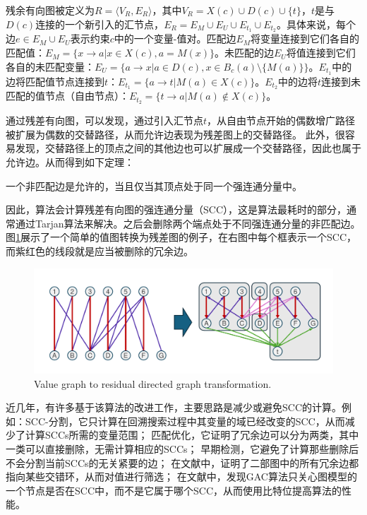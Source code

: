 \begin{definition}
    残余有向图被定义为$R = \langle V_R, E_R \rangle$，其中$V_R = X(c) \cup D(c) \cup \{t\}$，$t$是与$D(c)$连接的一个新引入的汇节点，$E_R = E_M \cup E_U \cup E_{t_1} \cup E_{t_2}$。具体来说，每个边$e \in E_M \cup E_U$表示约束$c$中的一个变量-值对。匹配边$E_M$将变量连接到它们各自的匹配值：$E_M = \{x \rightarrow a | x \in X(c), a = M(x)\}$。未匹配的边$E_U$将值连接到它们各自的未匹配变量：$E_U = \{a \rightarrow x | a \in D(c), x \in B_c(a) \setminus \{M (a)\}\}$。$E_{t_1}$中的边将匹配值节点连接到$t$：$E_{t_1} = \{a \rightarrow t | M (a) \in X(c)\}$。$E_{t_2}$中的边将$t$连接到未匹配的值节点（自由节点）：$E_{t_2} = \{t \rightarrow a | M (a) \notin X(c)\}$。
\end{definition}

通过残差有向图，可以发现，通过引入汇节点$t$，从自由节点开始的偶数增广路径被扩展为偶数的交替路径，从而允许边表现为残差图上的交替路径。
此外，很容易发现，交替路径上的顶点之间的其他边也可以扩展成一个交替路径，因此也属于允许边。从而得到如下定理：
\begin{theorem}
    一个非匹配边是允许的，当且仅当其顶点处于同一个强连通分量中。
\end{theorem}
因此，算法会计算残差有向图的强连通分量（SCC），这是算法最耗时的部分，通常通过Tarjan算法来解决。之后会删除两个端点处于不同强连通分量的非匹配边。图\ref{fig:Residual}展示了一个简单的值图转换为残差图的例子，在右图中每个框表示一个SCC，而紫红色的线段就是应当被删除的冗余边。

\begin{figure}[t]
    \centering
    \includegraphics[width=\columnwidth]{Img/Residual.pdf}
     {Value graph to residual directed graph transformation.}
    \label{fig:Residual}
\end{figure}

近几年，有许多基于该算法的改进工作，主要思路是减少或避免SCC的计算。例如：SCC-分割\cite{gent2008generalised}，它只计算在回溯搜索过程中其变量的域已经改变的SCC，从而减少了计算SCCs所需的变量范围；
匹配优化\cite{zhang2018fast}，它证明了冗余边可以分为两类，其中一类可以直接删除，无需计算相应的SCCs；
早期检测\cite{zhang2021early}，它避免了计算那些删除后不会分割当前SCCs的无关紧要的边；
在文献\cite{li2023bitwise}中，证明了二部图中的所有冗余边都指向某些交错环，从而对值进行筛选；
在文献\cite{zhen2023eliminating}中，发现GAC算法只关心图模型的一个节点是否在SCC中，而不是它属于哪个SCC，从而使用比特位提高算法的性能。

